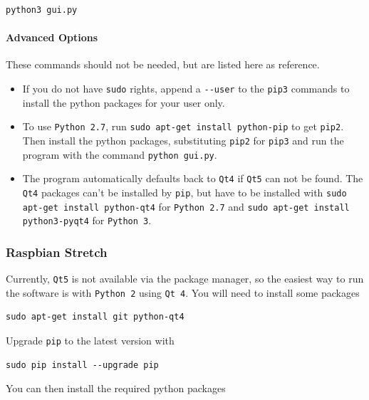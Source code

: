 \documentclass[a4paper]{article}
\begin{document}
\medskip
\begin{lstlisting}
python3 gui.py
\end{lstlisting}
\medskip

\paragraph{Advanced Options\\}
These commands should not be needed, but are listed here as reference.

\begin{itemize}
\item{} If you do not have {\tt sudo} rights, append a {\tt -{}-user} to the {\tt pip3} commands to install the python packages for your user only.

\item{} To use {\tt Python 2.7}, run {\tt sudo apt-get install python-pip} to get {\tt pip2}.
Then install the python packages, substituting {\tt pip2} for {\tt pip3} and run the program with the command {\tt python gui.py}.

\item{} The program automatically defaults back to {\tt Qt4} if {\tt Qt5} can not be found.
The {\tt Qt4} packages can't be installed by {\tt pip}, but have to be installed with {\tt sudo apt-get install python-qt4} for {\tt Python 2.7} and {\tt sudo apt-get install python3-pyqt4} for {\tt Python 3}.
\end{itemize}

\subsubsection{Raspbian Stretch}

Currently, {\tt Qt5} is not available via the package manager, so the easiest way to run the software is with {\tt Python 2} using {\tt Qt 4}.
You will need to install some packages

\medskip
\begin{lstlisting}
sudo apt-get install git python-qt4
\end{lstlisting}
\medskip

Upgrade {\tt pip} to the latest version with

\medskip
\begin{lstlisting}
sudo pip install --upgrade pip
\end{lstlisting}
\medskip

You can then install the required python packages
\end{document}

